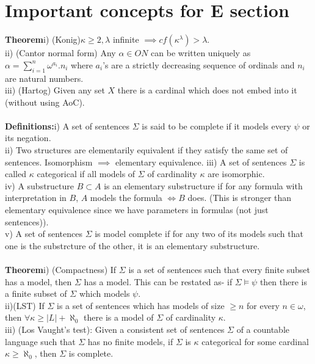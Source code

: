 \documentclass{article}
\begin{document}
	\section{Important concepts for E section}
	\textbf{Theorem}i) (Konig)$\kappa \geq 2, \lambda $ infinite $\implies cf(\kappa^\lambda)> \lambda$.\\
	ii) (Cantor normal form) Any $\alpha \in ON$ can be written uniquely as $\alpha = \sum_{i=1}^n \omega^{a_i}. n_i$ where $a_i$'s are a strictly decreasing sequence of ordinals and $n_i$ are natural numbers.\\
	iii) (Hartog) Given any set $X$ there is a cardinal which does not embed into it (without using AoC).\\
	\\
	\textbf{Definitions:}i) A set of sentences $\Sigma$ is said to be complete if it models every $\psi$ or its negation.\\
	ii) Two structures are elementarily equivalent if they satisfy the same set of sentences. Isomorphism $\implies$ elementary equivalence.
	iii) A set of sentences $\Sigma$ is called $\kappa$ categorical if all models of $\Sigma$ of cardinality $\kappa$ are isomorphic.\\
	iv) A substructure $B\subset A$ is an elementary substructure if for any formula with interpretation in $B$, $A$ models the formula $\iff B$ does. (This is stronger than elementary equivalence since we have parameters in formulas (not just sentences)).\\
	v) A set of sentences $\Sigma$ is model complete if for any two of its models such that one is the substrcture of the other, it is an elementary substructure.
	\\
	\\
	\textbf{Theorem}i) (Compactness) If $\Sigma$ is a set of sentences such that every finite subset has a model, then $\Sigma$ has a model. This can be restated as- if $\Sigma \models \psi$ then there is a finite subset of $\Sigma$ which models $\psi$.\\
	ii)(LST) If $\Sigma$ is a set of sentences which has models of size $\geq n$ for every $n \in \omega$, then $\forall \kappa \geq |L| + \aleph_0$ there is a model of $\Sigma$ of cardinality $\kappa$.\\
	iii) (Los Vaught's test): Given a consistent set of sentences $\Sigma$ of a countable language such that $\Sigma$ has no finite models, if $\Sigma$ is $\kappa$ categorical for some cardinal $\kappa\geq \aleph_0$, then $\Sigma$ is complete. \\
\end{document}
